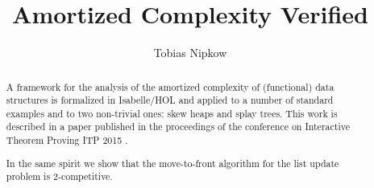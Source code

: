 \documentclass[11pt,a4paper]{article}
\begin{document}
\title{Amortized Complexity Verified}
\author{Tobias Nipkow}
\maketitle

\begin{abstract}
  A framework for the analysis of the amortized complexity of (functional)
  data structures is formalized in Isabelle/HOL and applied to a number of
  standard examples and to two non-trivial ones: skew heaps and splay trees.
  This work is described in a paper published in the proceedings of the
  conference on Interactive Theorem Proving ITP 2015 \cite{Nipkow-ITP15}.

  In the same spirit we show that the move-to-front algorithm for the list
  update problem is 2-competitive.
\end{abstract}

\setcounter{tocdepth}{2}
\tableofcontents
\newpage





\end{document}
